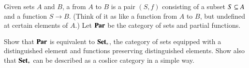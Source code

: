 \begin{question}
Given sets $A$ and $B$, a  from $A$ to $B$ is a pair $(S, f)$ consisting of a subset $S \subseteq
A$ and a function $S \to B$.  (Think of it as like a function from $A$ to
$B$, but undefined at certain elements of $A$.)  Let $\mathbf{Par}$ be the
category of sets and partial functions.

Show that $\mathbf{Par}$ is equivalent to $\mathbf{Set}_*$, the category of sets
equipped with a distinguished element and functions preserving
distinguished elements.  Show also that $\mathbf{Set}_*$ can be described as a
coslice category in a simple way.
\end{question}


